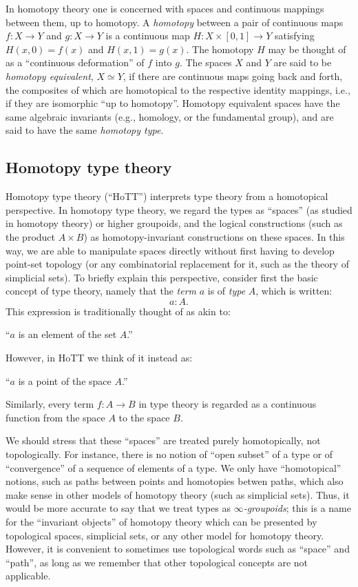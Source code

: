 In homotopy theory one is concerned with spaces and continuous mappings between them, 
up to homotopy.  A \emph{homotopy} between a pair of continuous maps $f \colon X \to Y$
and  $g \colon X\to Y$ is 
a continuous map $H \colon X \times [0, 1] \to Y$ satisfying
$H(x, 0) = f (x)$  and $H(x, 1) = g(x)$. The homotopy $H$ may be thought of as a ``continuous deformation'' of $f$ into $g$. The spaces $X$ and $Y$ are said to be \emph{homotopy equivalent}, $X\simeq Y$, if there are continuous maps going back and forth, the composites of which are homotopical to the respective identity mappings, i.e., if they are isomorphic ``up to homotopy''.  Homotopy equivalent spaces have the same algebraic invariants (e.g., homology, or the fundamental group), and are said to have the same \emph{homotopy type}.

\subsection*{Homotopy type theory}

Homotopy type theory (``HoTT'') interprets type theory from a homotopical perspective.
In homotopy type theory, we regard the types as ``spaces'' (as studied in homotopy theory) or higher groupoids, and the logical constructions (such as the product $A\times B$) as homotopy-invariant constructions on these spaces.
In this way, we are able to manipulate spaces directly without first having to develop point-set topology (or any combinatorial replacement for it, such as the theory of simplicial sets).
To briefly explain this perspective, consider first the basic concept of type theory, namely that
the \emph{term} $a$ is of \emph{type} $A$, which is written:
\[ a:A. \]
This expression is traditionally thought of as akin to:
\begin{center}
``$a$ is an element of the set $A$.''
\end{center}
However, in HoTT we think of it instead as:
\begin{center}
``$a$ is a point of the space $A$.''
\end{center}
Similarly, every term $f : A\to B$ in type theory is regarded as a continuous function from the space $A$ to the space $B$.

We should stress that these ``spaces'' are treated purely homotopically, not topologically.
For instance, there is no notion of ``open subset'' of a type or of ``convergence'' of a sequence of elements of a type.
We only have ``homotopical'' notions, such as paths between points and homotopies betwen paths, which also make sense in other models of homotopy theory (such as simplicial sets).
Thus, it would be more accurate to say that we treat types as \emph{$\infty$-groupoids}; this is a name for the ``invariant objects'' of homotopy theory which can be presented by topological spaces, simplicial sets, or any other model for homotopy theory.
However, it is convenient to sometimes use topological words such as ``space'' and ``path'', as long as we remember that other topological concepts are not applicable.

